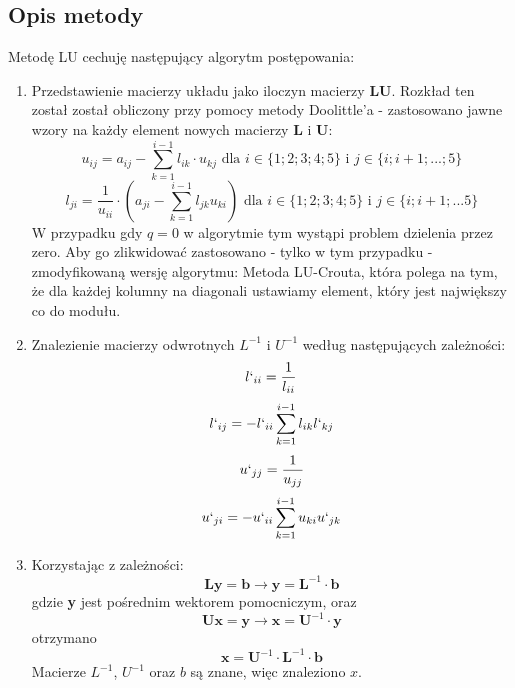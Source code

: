 \documentclass[a4paper]{article}
\begin{document}
\subsection{Opis metody}
Metodę LU cechuję następujący algorytm postępowania:
\begin{enumerate}
    \item Przedstawienie macierzy układu jako iloczyn macierzy \textbf{LU}. Rozkład ten został został obliczony przy pomocy metody Doolittle'a - zastosowano jawne wzory na każdy element nowych macierzy \textbf{L} i \textbf{U}:
$$
u_{ij}=a_{ij}-\sum^{i-1}_{k=1}{l_{ik}\cdot u_{kj}} \textrm{    dla } i\in{\{1;2;3;4;5\}}\textrm{ i } j\in{\{i;i+1;...;5\}}
$$
$$
l_{ji}=\frac{1}{u_{ii}}\cdot (a_{ji}-\sum^{i-1}_{k=1}{l_{jk}u_{ki}}) \textrm{ dla } i\in{\{1;2;3;4;5\}} \textrm{ i } j\in{\{i;i+1;...5\}}
$$
W przypadku gdy $q=0$ w algorytmie tym wystąpi problem dzielenia przez zero. Aby go zlikwidować zastosowano - tylko w tym przypadku - zmodyfikowaną wersję algorytmu: Metoda LU-Crouta, która polega na tym, że dla każdej kolumny na diagonali ustawiamy element, który jest największy co do modułu.
\item
Znalezienie macierzy odwrotnych $L^{-1}$ i $U^{-1}$ według następujących zależności:
$$
l`_{ii}=\frac{1}{l_{ii}}
$$
$$
l`_{ij}=-l`_{ii}\sum^{i-1}_{k=1}{l_{ik}l`_{kj}}
$$
$$
u`_{jj}=\frac{1}{u_{jj}}
$$
$$
u`_{ji}=-u`_{ii}\sum^{i-1}_{k=1}{u_{ki}u`_{jk}}
$$
\item
Korzystając z zależności:
$$
\textbf{Ly}=\textbf{b} \to \textbf{y}=\textbf{L}^{-1}\cdot \textbf{b}
$$
gdzie \textbf{y} jest pośrednim wektorem pomocniczym, oraz
$$
\textbf{Ux}=\textbf{y} \to \textbf{x}=\textbf{U}^{-1}\cdot \textbf{y}
$$
otrzymano 
$$
\textbf{x} = \textbf{U}^{-1} \cdot \textbf{L}^{-1} \cdot \textbf{b}
$$
Macierze $L^{-1}$, $U^{-1}$ oraz $b$ są znane, więc znaleziono $x$.
\end{enumerate}
\end{document}

